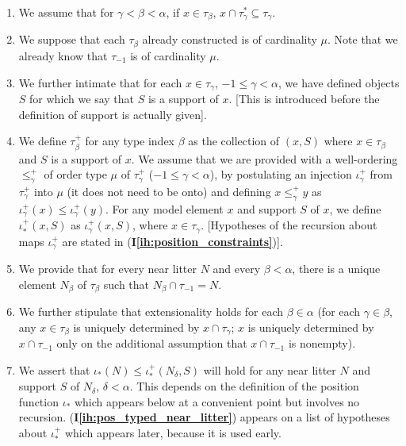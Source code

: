 \documentclass[112pt]{article}
\theoremstyle{definition}
\theoremstyle{remark}
\newcommand{\ihref}[1]{(\textbf{I\ref{#1}})}
\begin{document}
\begin{enumerate}

\renewcommand{\labelenumi}{(\textbf{I\theenumi})}

\item \label{ih:subset_tau} We assume that for $\gamma<\beta<\alpha$, if $x \in \tau_\beta$, $x \cap \tau^*_\gamma \subseteq \tau_\gamma$.

\item \label{ih:cardinality} We suppose that each $\tau_\beta$ already constructed is of cardinality $\mu$.  Note that we already know that
$\tau_{-1}$ is of cardinality $\mu$.

\item \label{ih:supports} We further intimate that for each $x \in \tau_\gamma$, $-1\leq \gamma<\alpha$, we have defined objects $S$ for which we say that $S$ is a support of $x$.  [This is introduced before the definition of support is actually given].

\item \label{ih:position} We define $\tau_\beta^+$ for any type index $\beta$ as the collection of $(x,S)$ where $x \in \tau_\beta$ and $S$ is a support of $x$.  We assume that we are provided with  a well-ordering $\leq^+_\gamma$ of order type $\mu$ of $\tau_\gamma^+$ ($-1 \leq \gamma <\alpha$), by postulating an injection $\iota^+_\gamma$ from $\tau_\gamma^+$ into $\mu$ (it does not need to be onto) and defining $x \leq^+_\gamma y$ as $\iota^+_\gamma(x) \leq \iota^+_\gamma(y)$.    For any model element $x$ and support $S$ of $x$, we define $\iota^+_*(x,S)$ as $\iota^+_\gamma(x,S)$, where $x \in \tau_\gamma$.    [Hypotheses of the recursion about maps $\iota^+_\gamma$ are stated {in \ihref{ih:position_constraints}}]. %

\item \label{ih:typed_near_litter} We provide that for every near litter $N$ and every $\beta<\alpha$, there is a unique element $N_\beta$ of $\tau_\beta$ such that $N_\beta \cap \tau_{-1}=N$.

\item \label{ih:extensionality} We further stipulate that extensionality holds for each $\beta\in \alpha$ (for each $\gamma\in \beta$, any $x \in \tau_\beta$ is uniquely determined by $x \cap \tau_\gamma$;  $x$ is uniquely determined by $x \cap \tau_{-1}$ only on the additional assumption that $x \cap \tau_{-1}$ is nonempty).

\item \label{ih:pos_typed_near_litter} We assert that $\iota_*(N) \leq \iota_*^+(N_\delta,S)$ will hold for any near litter $N$ and support $S$ of $N_\delta$, $\delta<\alpha$.  This depends on the definition
of the position function $\iota_*$ which appears below at a convenient point but involves no recursion.  \ihref{ih:pos_typed_near_litter} appears on a list of hypotheses about $\iota_*^+$ which appears later, because it is used early.


\end{enumerate}
\end{document}
